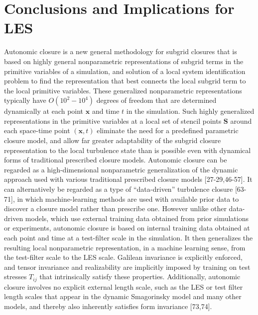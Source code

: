 \graphicspath{ {./Ch7/}  } 

\chapter{Conclusions and Implications for LES}

Autonomic closure is a new general methodology for subgrid closures that is based on highly general nonparametric representations of subgrid terms in the primitive variables of a simulation, and solution of a local system identification problem to find the representation that best connects the local subgrid term to the local primitive variables. These generalized nonparametric representations typically have $O(10^2-10^4)$ degrees of freedom that are determined dynamically at each point $\mathbf{x}$ and time $t$ in the simulation. Such highly generalized representations in the primitive variables at a local set of stencil points $\mathbf{S}$ around each space-time point $(\mathbf{x},t)$  eliminate the need for a predefined parametric closure model, and allow far greater adaptability of the subgrid closure representation to the local turbulence state than is possible even with dynamical forms of traditional prescribed closure models. 
Autonomic closure can be regarded as a high-dimensional nonparametric generalization of the dynamic approach used with various traditional prescribed closure models [27-29,46-57]. It can alternatively be regarded as a type of “data-driven” turbulence closure [63-71], in which machine-learning methods are used with available prior data to discover a closure model rather than prescribe one. However unlike other data-driven models, which use external training data obtained from prior simulations or experiments, autonomic closure is based on internal training data obtained at each point and time at a test-filter scale in the simulation. It then generalizes the resulting local nonparametric representation, in a machine learning sense, from the test-filter scale to the LES scale. Galilean invariance is explicitly enforced, and tensor invariance and realizability are implicitly imposed by training on test stresses $T_{ij}$  that intrinsically satisfy these properties. Additionally, autonomic closure involves no explicit external length scale, such as the LES or test filter length scales that appear in the dynamic Smagorinsky model and many other models, and thereby also inherently satisfies form invariance [73,74].

